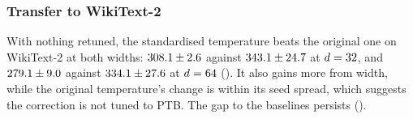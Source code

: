 \subsubsection{Transfer to WikiText-2}
\label{sec:exp-wt2}
With nothing retuned, the standardised temperature beats the original one on WikiText-2 at both
widths: $308.1\pm2.6$ against $343.1\pm24.7$ at $d=32$,
and $279.1\pm9.0$ against $334.1\pm27.6$ at $d=64$
(). It also gains more from width, while the original temperature's change is
within its seed spread, which suggests the correction is not tuned to PTB. The gap to the
baselines persists ().

